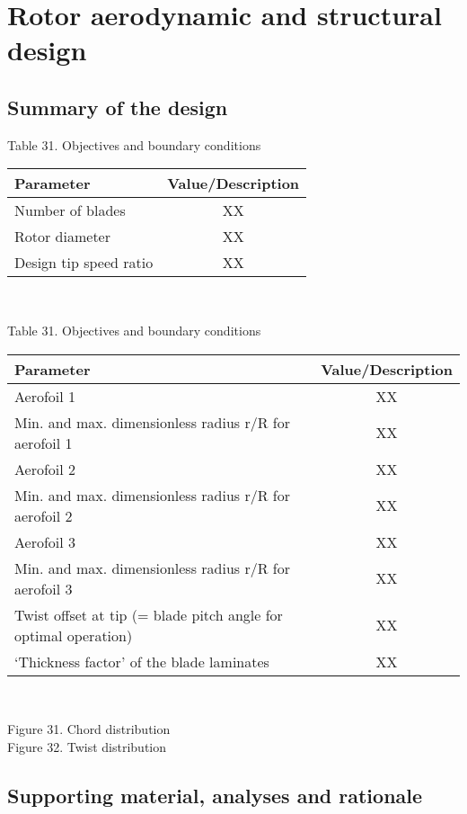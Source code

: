 \section{Rotor aerodynamic and structural design}

\subsection{Summary of the design}
\begin{center}
Table 31. Objectives and boundary conditions\\
\begin{tabular}{ |l|c| } 
\hline
\textbf{Parameter} & \textbf{Value/Description}  \\ 
\hline
Number of blades & XX  \\ 
\hline
Rotor diameter & XX \\ 
\hline
Design tip speed ratio & XX \\
\hline
\end{tabular} \\
\end{center}


\begin{center}
Table 31. Objectives and boundary conditions\\
\begin{tabular}{ |l|c| } 
\hline
\textbf{Parameter} & \textbf{Value/Description}  \\ 
\hline
Aerofoil 1 & XX  \\ 
\hline
Min. and max. dimensionless radius r/R for aerofoil 1 & XX \\ 
\hline
Aerofoil 2 & XX \\
\hline
Min. and max. dimensionless radius r/R for aerofoil 2 & XX \\
\hline
Aerofoil 3 & XX \\
\hline
Min. and max. dimensionless radius r/R for aerofoil 3 & XX \\
\hline
Twist offset at tip (= blade pitch angle for optimal operation) & XX \\
\hline
‘Thickness factor’ of the blade laminates & XX \\
\hline
\end{tabular} \\
\end{center}


Figure 31. Chord distribution\\

Figure 32. Twist distribution\\

\subsection{Supporting material, analyses and rationale}
